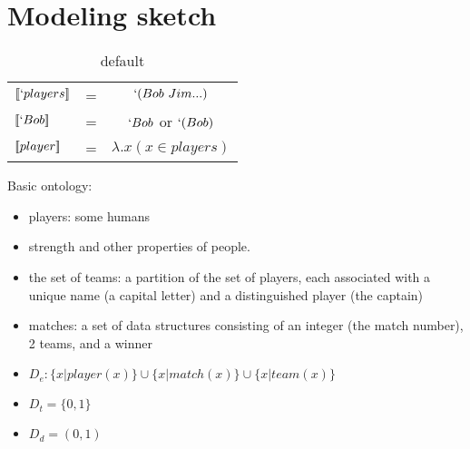 \documentclass[12pt]{article}
\newcommand{\llbracket}{\ensuremath{\left [\!\left [}}%
\newcommand{\rrbracket}{\ensuremath{\right ]\!\right ]}}
\providecommand{\sv}[1]{\ensuremath{\llbracket #1 \rrbracket}}
\begin{document}
\section{Modeling sketch}

\begin{table}[htdp]
\caption{default}
\begin{center}
\begin{tabular}{llc}
\sv{`players}&= & $`(Bob\ Jim ...)$ \\
\sv{`Bob}&= & $`Bob$ or $`(Bob)$ \\
\sv{player}&= & $\lambda.x (x\in players) $ \\
 
\end{tabular}
\end{center}
\label{default}
\end{table}%



\noindent Basic ontology: 
\begin{itemize}
\item players: some humans
\item strength and other properties of people.
\item the set of teams: a partition of the set of players, each associated with a unique name (a capital letter) and a distinguished player (the captain)
\item matches: a set of data structures consisting of an integer (the match number), 2 teams, and a winner
\item $D_e: \{x|\mathit{player}(x)\} \cup \{x|\mathit{match}(x)\} \cup \{x|\mathit{team}(x)\}$
\item $D_t = \{0,1\}$
\item $D_d = (0,1)$
\end{itemize}
\end{document}
